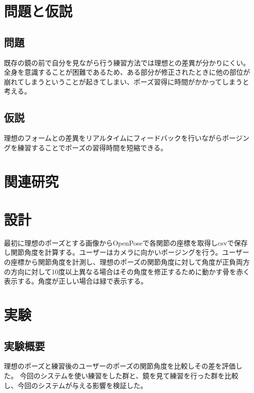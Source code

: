 \documentclass[a4j,10pt]{jsarticle}
\begin{document}

\section{問題と仮説}
\subsection*{問題}
既存の鏡の前で自分を見ながら行う練習方法では理想との差異が分かりにくい。全身を意識することが困難であるため、ある部分が修正されたときに他の部位が崩れてしまうということが起きてしまい、ポーズ習得に時間がかかってしまうと考える。
\subsection*{仮説}
理想のフォームとの差異をリアルタイムにフィードバックを行いながらポージングを練習することでポーズの習得時間を短縮できる。
\section{関連研究}

 
\section{設計}
最初に理想のポーズとする画像からOpenPoseで各関節の座標を取得しcsvで保存し関節角度を計算する。ユーザーはカメラに向かいポージングを行う。ユーザーの座標から関節角度を計測し、理想のポーズの関節角度に対して角度が正負両方の方向に対して10度以上異なる場合はその角度を修正するために動かす骨を赤く表示する。角度が正しい場合は緑で表示する。
\section{実験}
\subsection{実験概要}
理想のポーズと練習後のユーザーのポーズの関節角度を比較しその差を評価した。
今回のシステムを使い練習をした群と、鏡を見て練習を行った群を比較し、今回のシステムが与える影響を検証した。
\end{document}
